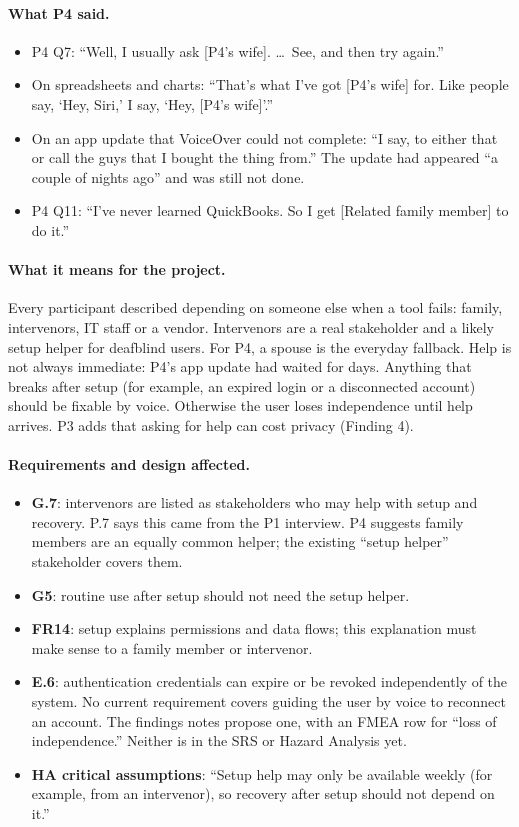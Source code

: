 \documentclass[12pt, titlepage]{article}
\newcommand{\saidfour}{\paragraph{What P4 said.}}
\newcommand{\means}{\paragraph{What it means for the project.}}
\newcommand{\affects}{\paragraph{Requirements and design affected.}}
\begin{document}
\saidfour
\begin{itemize}
    \item P4 Q7: ``Well, I usually ask [P4's wife]. \ldots\ See, and then try again.''
    \item On spreadsheets and charts: ``That's what I've got [P4's wife] for. Like people say, `Hey, Siri,' I say, `Hey, [P4's wife]'.''
    \item On an app update that VoiceOver could not complete: ``I say, to either that or call the guys that I bought the thing from.'' The update had appeared ``a couple of nights ago'' and was still not done.
    \item P4 Q11: ``I've never learned QuickBooks. So I get [Related family member] to do it.''
\end{itemize}

\means
Every participant described depending on someone else when a tool fails: family, intervenors, IT staff or a vendor. Intervenors are a real stakeholder and a likely setup helper for deafblind users. For P4, a spouse is the everyday fallback. Help is not always immediate: P4's app update had waited for days. Anything that breaks after setup (for example, an expired login or a disconnected account) should be fixable by voice. Otherwise the user loses independence until help arrives. P3 adds that asking for help can cost privacy (Finding 4).

\affects
\begin{itemize}
    \item \textbf{G.7}: intervenors are listed as stakeholders who may help with setup and recovery. P.7 says this came from the P1 interview. P4 suggests family members are an equally common helper; the existing ``setup helper'' stakeholder covers them.
    \item \textbf{G5}: routine use after setup should not need the setup helper.
    \item \textbf{FR14}: setup explains permissions and data flows; this explanation must make sense to a family member or intervenor.
    \item \textbf{E.6}: authentication credentials can expire or be revoked independently of the system. No current requirement covers guiding the user by voice to reconnect an account. The findings notes propose one, with an FMEA row for ``loss of independence.'' Neither is in the SRS or Hazard Analysis yet.
    \item \textbf{HA critical assumptions}: ``Setup help may only be available weekly (for example, from an intervenor), so recovery after setup should not depend on it.''
\end{itemize}
\end{document}
